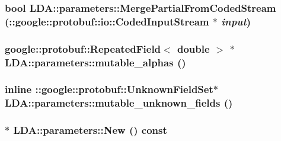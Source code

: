 \label{class_l_d_a_1_1parameters_ada86da0ba8a80442b5a71896a4897450}
\hypertarget{class_l_d_a_1_1parameters_a01f7a58cf08755a24b0c8638e43c4640}{
\subsubsection[{MergePartialFromCodedStream}]{\setlength{\rightskip}{0pt plus 5cm}bool LDA::parameters::MergePartialFromCodedStream (::google::protobuf::io::CodedInputStream $\ast$ {\em input})}}
\label{class_l_d_a_1_1parameters_a01f7a58cf08755a24b0c8638e43c4640}
\hypertarget{class_l_d_a_1_1parameters_a1d1708304e2ead9d68e03e663d219f63}{
\subsubsection[{mutable\_\-alphas}]{\setlength{\rightskip}{0pt plus 5cm}google::protobuf::RepeatedField$<$ double $>$ $\ast$ LDA::parameters::mutable\_\-alphas ()}}
\label{class_l_d_a_1_1parameters_a1d1708304e2ead9d68e03e663d219f63}
\hypertarget{class_l_d_a_1_1parameters_ae450b6dcde59b497409636fbe1a82f7f}{
\subsubsection[{mutable\_\-unknown\_\-fields}]{\setlength{\rightskip}{0pt plus 5cm}inline ::google::protobuf::UnknownFieldSet$\ast$ LDA::parameters::mutable\_\-unknown\_\-fields ()}}
\label{class_l_d_a_1_1parameters_ae450b6dcde59b497409636fbe1a82f7f}
\hypertarget{class_l_d_a_1_1parameters_ab0fa3fbe376bdf09d54f67ad37fa99c1}{
\subsubsection[{New}]{ $\ast$ LDA::parameters::New () const}}
